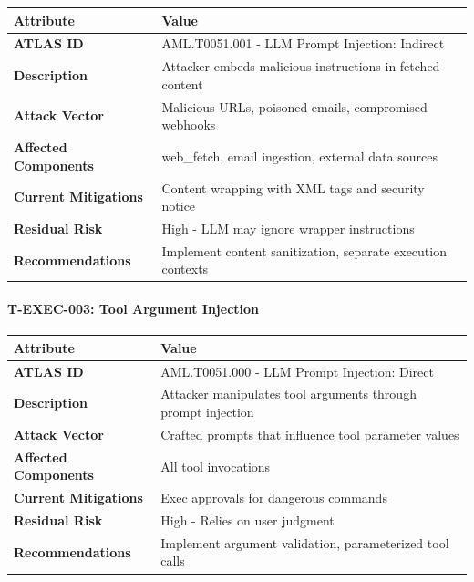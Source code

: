 \begin{table}[h]
\centering
\small
\begin{tabular}{|l|l|}
\hline
Attribute & Value \\
\hline
\textbf{ATLAS ID} & AML.T0051.001 - LLM Prompt Injection: Indirect \\
\hline
\textbf{Description} & Attacker embeds malicious instructions in fetched content \\
\hline
\textbf{Attack Vector} & Malicious URLs, poisoned emails, compromised webhooks \\
\hline
\textbf{Affected Components} & web\_fetch, email ingestion, external data sources \\
\hline
\textbf{Current Mitigations} & Content wrapping with XML tags and security notice \\
\hline
\textbf{Residual Risk} & High - LLM may ignore wrapper instructions \\
\hline
\textbf{Recommendations} & Implement content sanitization, separate execution contexts \\
\hline
\end{tabular}
\end{table}



\paragraph{T-EXEC-003: Tool Argument Injection}



\begin{table}[h]
\centering
\small
\begin{tabular}{|l|l|}
\hline
Attribute & Value \\
\hline
\textbf{ATLAS ID} & AML.T0051.000 - LLM Prompt Injection: Direct \\
\hline
\textbf{Description} & Attacker manipulates tool arguments through prompt injection \\
\hline
\textbf{Attack Vector} & Crafted prompts that influence tool parameter values \\
\hline
\textbf{Affected Components} & All tool invocations \\
\hline
\textbf{Current Mitigations} & Exec approvals for dangerous commands \\
\hline
\textbf{Residual Risk} & High - Relies on user judgment \\
\hline
\textbf{Recommendations} & Implement argument validation, parameterized tool calls \\
\hline
\end{tabular}
\end{table}



